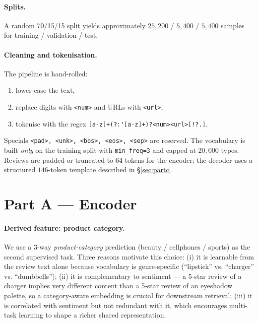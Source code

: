 \documentclass[11pt,a4paper]{article}
\begin{document}
\paragraph{Splits.} A random 70/15/15 split yields approximately
$25{,}200$ / $5{,}400$ / $5{,}400$ samples for training / validation / test.

\paragraph{Cleaning and tokenisation.} The pipeline is hand-rolled:
\begin{enumerate}[noitemsep,leftmargin=*]
  \item lower-case the text,
  \item replace digits with \texttt{<num>} and URLs with \texttt{<url>},
  \item tokenise with the regex
        \verb|[a-z]+(?:'[a-z]+)?|\verb|<num>|\verb|<url>|\verb|[!?.]|.
\end{enumerate}
Specials \texttt{<pad>, <unk>, <bos>, <eos>, <sep>} are reserved. The
vocabulary is built \emph{only} on the training split with
\texttt{min\_freq=3} and capped at $20{,}000$ types. Reviews are padded or
truncated to $64$ tokens for the encoder; the decoder uses a structured
$146$-token template described in \S\ref{sec:partc}.

\section{Part A --- Encoder}
\paragraph{Derived feature: product category.}
We use a 3-way \emph{product-category} prediction (beauty / cellphones /
sports) as the second supervised task. Three reasons motivate this choice:
(i) it is learnable from the review text alone because vocabulary is
genre-specific (``lipstick'' vs. ``charger'' vs. ``dumbbells'');
(ii) it is complementary to sentiment --- a 5-star review of a charger
implies very different content than a 5-star review of an eyeshadow palette,
so a category-aware embedding is crucial for downstream retrieval;
(iii) it is correlated with sentiment but not redundant with it, which
encourages multi-task learning to shape a richer shared representation.
\end{document}
